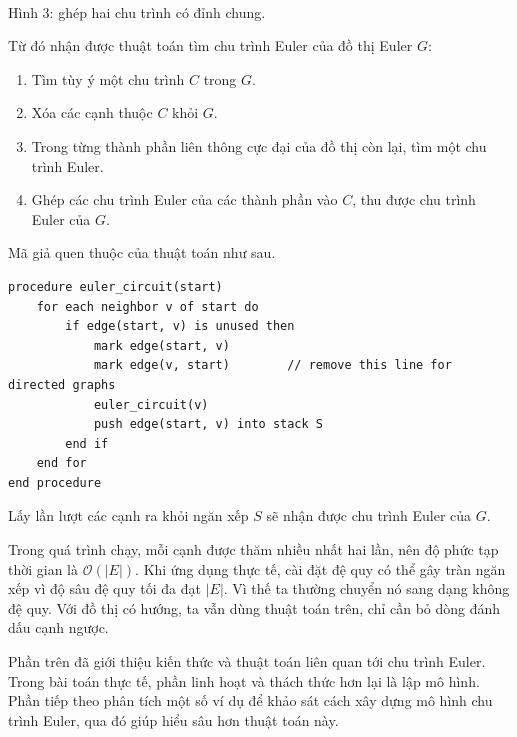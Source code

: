 \documentclass[11pt]{article}
\newcommand{\Oh}{\mathcal{O}}
\begin{document}
\begin{center}
\\
\small Hình 3: ghép hai chu trình có đỉnh chung.
\end{center}

Từ đó nhận được thuật toán tìm chu trình Euler của đồ thị Euler \(G\):
\begin{enumerate}
  \item Tìm tùy ý một chu trình \(C\) trong \(G\).
  \item Xóa các cạnh thuộc \(C\) khỏi \(G\).
  \item Trong từng thành phần liên thông cực đại của đồ thị còn lại, tìm một
  chu trình Euler.
  \item Ghép các chu trình Euler của các thành phần vào \(C\), thu được chu
  trình Euler của \(G\).
\end{enumerate}

Mã giả quen thuộc của thuật toán như sau.
\begin{verbatim}
procedure euler_circuit(start)
    for each neighbor v of start do
        if edge(start, v) is unused then
            mark edge(start, v)
            mark edge(v, start)        // remove this line for directed graphs
            euler_circuit(v)
            push edge(start, v) into stack S
        end if
    end for
end procedure
\end{verbatim}
Lấy lần lượt các cạnh ra khỏi ngăn xếp \(S\) sẽ nhận được chu trình Euler của
\(G\).

Trong quá trình chạy, mỗi cạnh được thăm nhiều nhất hai lần, nên độ phức tạp
thời gian là \(\Oh(|E|)\). Khi ứng dụng thực tế, cài đặt đệ quy có thể gây tràn
ngăn xếp vì độ sâu đệ quy tối đa đạt \(|E|\). Vì thế ta thường chuyển nó sang
dạng không đệ quy. Với đồ thị có hướng, ta vẫn dùng thuật toán trên, chỉ cần
bỏ dòng đánh dấu cạnh ngược.

Phần trên đã giới thiệu kiến thức và thuật toán liên quan tới chu trình Euler.
Trong bài toán thực tế, phần linh hoạt và thách thức hơn lại là lập mô hình.
Phần tiếp theo phân tích một số ví dụ để khảo sát cách xây dựng mô hình chu
trình Euler, qua đó giúp hiểu sâu hơn thuật toán này.
\end{document}
